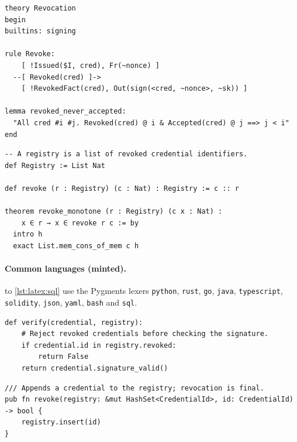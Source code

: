 \begin{lstlisting}[style=tamarin, float=tbp, caption={Tamarin: revocation as a multiset-rewriting rule and a lemma.}, label={lst:latex:tamarin}]
theory Revocation
begin
builtins: signing

rule Revoke:
    [ !Issued($I, cred), Fr(~nonce) ]
  --[ Revoked(cred) ]->
    [ !RevokedFact(cred), Out(sign(<cred, ~nonce>, ~sk)) ]

lemma revoked_never_accepted:
  "All cred #i #j. Revoked(cred) @ i & Accepted(cred) @ j ==> j < i"
end
\end{lstlisting}

\begin{lstlisting}[style=lean, float=tbp, caption={Lean 4: the registry only grows (\cref{inv:latex:monotone}).}, label={lst:latex:lean}]
-- A registry is a list of revoked credential identifiers.
def Registry := List Nat

def revoke (r : Registry) (c : Nat) : Registry := c :: r

theorem revoke_monotone (r : Registry) (c x : Nat) :
    x ∈ r → x ∈ revoke r c := by
  intro h
  exact List.mem_cons_of_mem c h
\end{lstlisting}

\FloatBarrier
\paragraph{Common languages (minted).}
 to \cref{lst:latex:sql} use the Pygments lexers \texttt{python}, \texttt{rust}, \texttt{go}, \texttt{java}, \texttt{typescript}, \texttt{solidity}, \texttt{json}, \texttt{yaml}, \texttt{bash} and \texttt{sql}.
\begin{listing}[!ht]
\begin{verbatim}
def verify(credential, registry):
    # Reject revoked credentials before checking the signature.
    if credential.id in registry.revoked:
        return False
    return credential.signature_valid()
\end{verbatim}
\caption{Python.}\label{lst:latex:verify}
\end{listing}

\begin{listing}[!ht]
\begin{verbatim}
/// Appends a credential to the registry; revocation is final.
pub fn revoke(registry: &mut HashSet<CredentialId>, id: CredentialId) -> bool {
    registry.insert(id)
}
\end{verbatim}
\caption{Rust.}\label{lst:latex:rust}
\end{listing}

